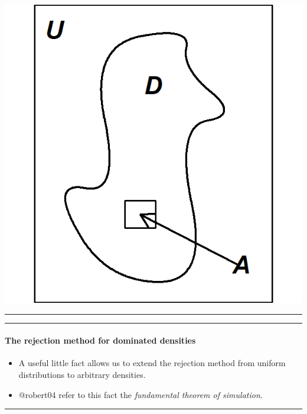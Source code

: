 \documentclass[]{article}
\let\oldparagraph\paragraph
\renewcommand{\paragraph}[1]{\oldparagraph{#1}\mbox{}}
\begin{document}
\begin{center}\includegraphics{figure/monteCarlo-region-diagram-1} \end{center}

\begin{center}\rule{0.5\linewidth}{\linethickness}\end{center}

\begin{center}\rule{0.5\linewidth}{\linethickness}\end{center}

\paragraph{The rejection method for dominated
densities}\label{the-rejection-method-for-dominated-densities}

\begin{itemize}
\item
  A useful little fact allows us to extend the rejection method from
  uniform distributions to arbitrary densities.
\item
  @robert04 refer to this fact the \emph{fundamental theorem of
  simulation}.
\end{itemize}

\begin{center}\rule{0.5\linewidth}{\linethickness}\end{center}
\end{document}
